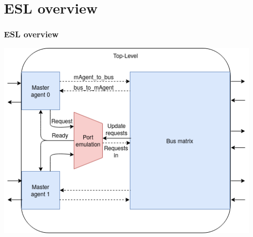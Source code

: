 \documentclass[]{beamer}
\begin{document}
    
       \section{ESL overview}
         \begin{frame}
          \frametitle{ESL overview}
             \begin{center}
             \includegraphics[scale=0.5]{pics/syslev_new.png}
             \end{center}
         \end{frame}
\end{document}
